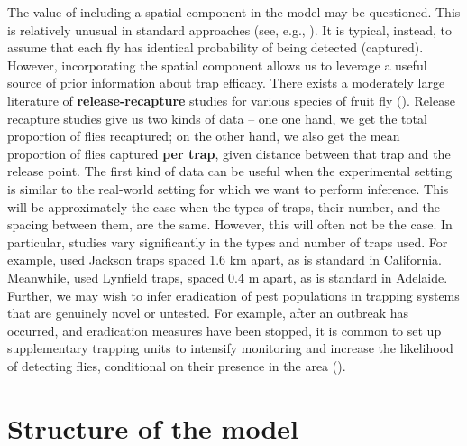 \documentclass[
  oneside]{book}
\begin{document}
The value of including a spatial component in the model may be questioned. This is relatively unusual in standard approaches (see, e.g., \citet{mcardle1990}). It is typical, instead, to assume that each fly has identical probability of being detected (captured). However, incorporating the spatial component allows us to leverage a useful source of prior information about trap efficacy. There exists a moderately large literature of \textbf{release-recapture} studies for various species of fruit fly (\citet{todocite}). Release recapture studies give us two kinds of data -- one one hand, we get the total proportion of flies recaptured; on the other hand, we also get the mean proportion of flies captured \textbf{per trap}, given distance between that trap and the release point. The first kind of data can be useful when the experimental setting is similar to the real-world setting for which we want to perform inference. This will be approximately the case when the types of traps, their number, and the spacing between them, are the same. However, this will often not be the case. In particular, studies vary significantly in the types and number of traps used. For example, \citet{lance1994} used Jackson traps spaced 1.6 km apart, as is standard in California. Meanwhile, \citet{ms2007} used Lynfield traps, spaced 0.4 m apart, as is standard in Adelaide. Further, we may wish to infer eradication of pest populations in trapping systems that are genuinely novel or untested. For example, after an outbreak has occurred, and eradication measures have been stopped, it is common to set up supplementary trapping units to intensify monitoring and increase the likelihood of detecting flies, conditional on their presence in the area (\citet{supptraps}).

\hypertarget{structure-of-the-model}{%
\section{Structure of the model}\label{structure-of-the-model}}
\end{document}
